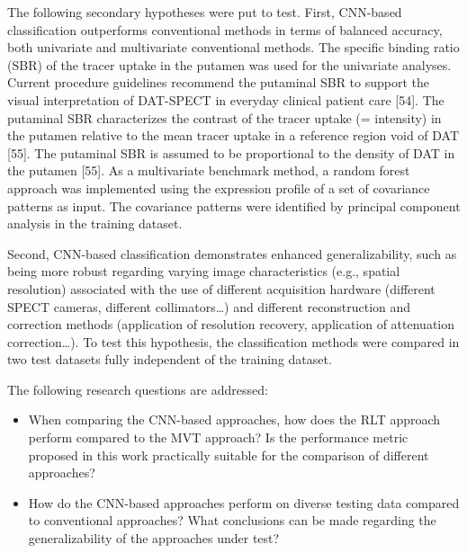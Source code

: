 The following secondary hypotheses were put to test. First, CNN-based classification outperforms conventional methods in terms of balanced accuracy, 
both univariate and multivariate conventional methods. 
The specific binding ratio (SBR) of the tracer uptake in the putamen was used for the univariate analyses. 
Current procedure guidelines recommend the putaminal SBR to support the visual interpretation of DAT-SPECT in everyday clinical patient care [54]. 
The putaminal SBR characterizes the contrast of the tracer uptake (= intensity) in the putamen relative to the mean tracer uptake in a reference 
region void of DAT [55]. 
The putaminal SBR is assumed to be proportional to the density of DAT in the putamen [55]. 
As a multivariate benchmark method, a random forest approach was implemented using the expression profile of a set of covariance patterns as input. 
The covariance patterns were identified by principal component analysis in the training dataset. 

Second, CNN-based classification demonstrates enhanced generalizability, such as being more robust regarding varying image characteristics 
(e.g., spatial resolution) 
associated with the use of different acquisition hardware 
(different SPECT cameras, different collimators\dots) 
and different reconstruction and correction methods (application of resolution recovery, application of attenuation correction\dots). 
To test this hypothesis, the classification methods were compared in two test datasets fully independent of the training dataset.

The following research questions are addressed: 
\begin{itemize}
    \item When comparing the CNN-based approaches, how does the RLT approach perform compared to the MVT approach? 
    Is the performance metric proposed in this work practically suitable for the comparison of different approaches?

    \item How do the CNN-based approaches perform on diverse testing data compared to conventional approaches?
    What conclusions can be made regarding the generalizability of the approaches under test?
    
\end{itemize}





